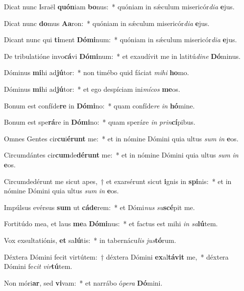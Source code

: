 \item Dicat nunc Israël \textbf{quón}iam \textbf{bo}nus:~* quóniam in sǽculum misericór\textit{di}\textit{a} \textbf{e}jus.
\item Dicat nunc \textbf{do}mus \textbf{A}\textbf{a}ron:~* quóniam in sǽculum misericór\textit{di}\textit{a} \textbf{e}jus.
\item Dicant nunc qui \textbf{ti}ment \textbf{Dó}\textbf{mi}num:~* quóniam in sǽculum misericór\textit{di}\textit{a} \textbf{e}jus.
\item De tribulatióne invo\textbf{cá}vi \textbf{Dó}\textbf{mi}num:~* et exaudívit me in latitú\textit{di}\textit{ne} \textbf{Dó}minus.
\item Dóminus \textbf{mi}hi ad\textbf{jú}tor:~* non timébo quid fáciat \textit{mi}\textit{hi} \textbf{ho}mo.
\item Dóminus \textbf{mi}hi ad\textbf{jú}tor:~* et ego despíciam ini\textit{mí}\textit{cos} \textbf{me}os.
\item Bonum est confíde\textbf{re} in \textbf{Dó}\textbf{mi}no:~* quam confíde\textit{re} \textit{in} \textbf{hó}mine.
\item Bonum est spe\textbf{rá}re in \textbf{Dó}\textbf{mi}no:~* quam speráre \textit{in} \textit{prin}\textbf{cí}pibus.
\item Omnes Gentes cir\textbf{cu}i\textbf{é}\textbf{runt} me:~* et in nómine Dómini quia ultus \textit{sum} \textit{in} \textbf{e}os.
\item Circumdántes cir\textbf{cum}de\textbf{dé}\textbf{runt} me:~* et in nómine Dómini quia ultus \textit{sum} \textit{in} \textbf{e}os.
\item Circumdedérunt me sicut apes,~† et exarsérunt sicut \textbf{i}gnis in \textbf{spi}nis:~* et in nómine Dómini quia ultus \textit{sum} \textit{in} \textbf{e}os.
\item Impúlsus evérsus \textbf{sum} ut \textbf{cá}\textbf{de}rem:~* et Dómi\textit{nus} \textit{su}\textbf{scé}pit me.
\item Fortitúdo mea, et laus \textbf{me}a \textbf{Dó}\textbf{mi}nus:~* et factus est mihi \textit{in} \textit{sa}\textbf{lú}tem.
\item Vox exsultatiónis, \textbf{et} sa\textbf{lú}tis:~* in tabernácu\textit{lis} \textit{jus}\textbf{tó}rum.
\item Déxtera Dómini fecit virtútem:~† déxtera Dómini \textbf{ex}al\textbf{tá}\textbf{vit} me,~* déxtera Dómini fe\textit{cit} \textit{vir}\textbf{tú}tem.
\item Non móri\textbf{ar}, sed \textbf{vi}vam:~* et narrábo ó\textit{pe}\textit{ra} \textbf{Dó}mini.
